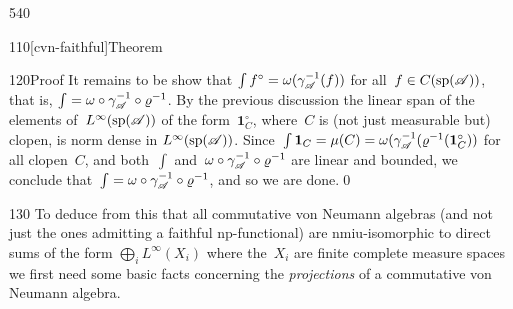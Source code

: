 \begin{parsec}{540}
\begin{point}{110}[cvn-faithful]{Theorem}
\begin{point}{120}{Proof}
It remains to be show that
$\int f^\circ = \omega(\gamma_{\mathscr{A}}^{-1}(f))$
for all~$f\in C(\mathrm{sp}(\mathscr{A}))$,
that is, $\int = \omega\circ \gamma_{\mathscr{A}}^{-1}\circ \varrho^{-1}$.
By the previous discussion the linear span
of the elements of~$L^\infty(\mathrm{sp}(\mathscr{A}))$
of the form~$\mathbf{1}_C^\circ$,
where~$C$ is (not just measurable but) clopen,
is norm dense in $L^\infty(\mathrm{sp}(\mathscr{A}))$.
Since~$\int \mathbf{1}_C
= \mu(C)=\omega(\gamma_{\mathscr{A}}^{-1} (\varrho^{-1}(\mathbf{1}_C^\circ ))$
for all clopen~$C$,
and both~$\int$ and~$\omega\circ\gamma_{\mathscr{A}}^{-1}\circ \varrho^{-1}$
are linear and bounded,
we conclude that~$\int = \omega\circ \gamma_{\mathscr{A}}^{-1} \circ \varrho^{-1}$,
and so we are done.\qed
\end{point}
\begin{point}{130}%
To deduce from this that all commutative von Neumann algebras
(and not just the ones admitting a faithful np-functional)
are nmiu-isomorphic
to direct sums of the form  $\bigoplus_i L^\infty(X_i)$
where the~$X_i$ are finite complete measure spaces
we first need some basic facts concerning the
\emph{projections} of a commutative von Neumann algebra.
\end{point}
\end{point}
\end{parsec}%
